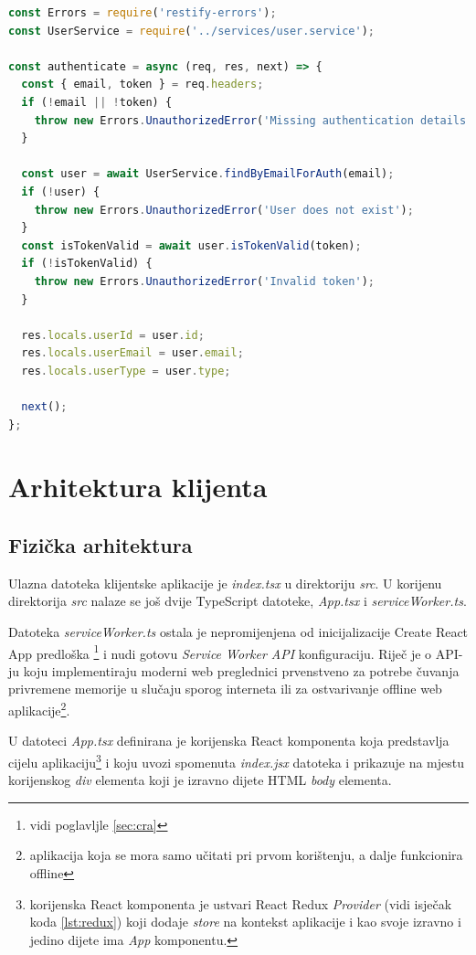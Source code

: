 \documentclass[times, utf8, diplomski, numeric]{fer}
\newcommand{\razmakp}{\vspace{18pt}}
\newcommand{\razmaks}{\vspace{10pt}}
\begin{document}
\razmakp %
\begin{lstlisting}[language=JavaScript, caption={Implementacija \emph{authenticate} metode u \emph{authentication.middleware.js}}, label={lst:auth}]
const Errors = require('restify-errors');
const UserService = require('../services/user.service');

const authenticate = async (req, res, next) => {
  const { email, token } = req.headers;
  if (!email || !token) {
    throw new Errors.UnauthorizedError('Missing authentication details');
  }

  const user = await UserService.findByEmailForAuth(email);
  if (!user) {
    throw new Errors.UnauthorizedError('User does not exist');
  }
  const isTokenValid = await user.isTokenValid(token);
  if (!isTokenValid) {
    throw new Errors.UnauthorizedError('Invalid token');
  }

  res.locals.userId = user.id;
  res.locals.userEmail = user.email;
  res.locals.userType = user.type;

  next();
};
\end{lstlisting}
\razmaks


\newpage
\section{Arhitektura klijenta}

\razmaks
\subsection{Fizička arhitektura}

Ulazna datoteka klijentske aplikacije je \emph{index.tsx} u direktoriju \emph{src}.
U korijenu direktorija \emph{src} nalaze se još dvije TypeScript datoteke, \emph{App.tsx} i \emph{serviceWorker.ts}.

Datoteka \emph{serviceWorker.ts} ostala je nepromijenjena od inicijalizacije Create React App predloška \footnote{vidi poglavljle \ref{sec:cra}} i nudi gotovu \emph{Service Worker API} konfiguraciju.
Riječ je o API-ju koju implementiraju moderni web preglednici prvenstveno za potrebe čuvanja privremene memorije  u slučaju sporog interneta ili za ostvarivanje offline web aplikacije\footnote{
    aplikacija koja se mora samo učitati pri prvom korištenju, a dalje funkcionira offline
}.

U datoteci \emph{App.tsx} definirana je korijenska React komponenta koja predstavlja cijelu aplikaciju\footnote{
    korijenska React komponenta je ustvari React Redux \emph{Provider} (vidi isječak koda \ref{lst:redux}) koji dodaje \emph{store} na kontekst aplikacije i kao svoje izravno i jedino dijete ima \emph{App} komponentu.
} i koju uvozi  spomenuta \emph{index.jsx} datoteka i prikazuje  na mjestu korijenskog \emph{div} elementa koji je izravno dijete HTML \emph{body} elementa.
\end{document}
